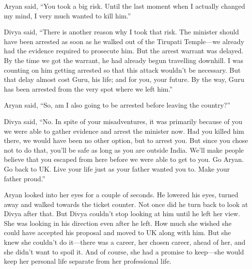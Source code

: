 Aryan said, “You took a big risk. Until the last moment when I actually changed
my mind, I very much wanted to kill him.”

Divya said, “There is another reason why I took that risk. The minister should
have been arrested as soon as he walked out of the Tirupati Temple—we already
had the evidence required to prosecute him. But the arrest warrant was delayed.
By the time we got the warrant, he had already begun travelling downhill. I was
counting on him getting arrested so that this attack wouldn't be necessary. But
that delay almost cost Guru, his life; and for you, your future. By the way,
Guru has been arrested from the very spot where we left him.”

Aryan said, “So, am I also going to be arrested before leaving the country?”

Divya said, “No. In spite of your misadventures, it was primarily because of you
we were able to gather evidence and arrest the minister now. Had you killed him
there, we would have been no other option, but to arrest you. But since you
chose not
to do that, you'll be safe as long as you are outside India. We'll make people
believe that you escaped from here before we were able to get to you. Go Aryan.
Go back to UK. Live your life just as your father wanted you to. Make your
father proud.”

Aryan looked into her eyes for a couple of seconds. He lowered his eyes, turned
away and walked towards the ticket counter. Not once did he turn back to look at
Divya after that. But Divya couldn't stop looking at him until he left her view.
She was looking in his direction even after he left. How much she wished she
could have accepted his proposal and moved to UK along with him. But she knew
she couldn't do it—there was a career, her chosen career, ahead of her, and she
didn't want to spoil it. And of course, she had a promise to keep—she would
keep her personal life separate from her professional life.